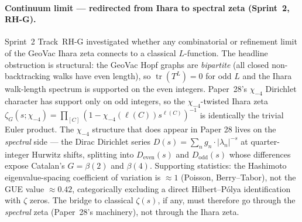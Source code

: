 \documentclass[11pt]{article}
\begin{document}
\paragraph{Continuum limit --- redirected from Ihara to spectral zeta
(Sprint~2, RH-G).}  Sprint~2 Track~RH-G investigated whether any
combinatorial or refinement limit of the GeoVac Ihara zeta connects
to a classical $L$-function.  The headline obstruction is structural:
the GeoVac Hopf graphs are \emph{bipartite} (all closed
non-backtracking walks have even length), so $\operatorname{tr}(T^L)=0$
for odd $L$ and the Ihara walk-length spectrum is supported on the
even integers.  Paper~28's $\chi_{-4}$ Dirichlet character has support
only on odd integers, so the $\chi_{-4}$-twisted Ihara zeta
$\zeta_G(s;\chi_{-4}) = \prod_{[C]}(1 - \chi_{-4}(\ell(C))s^{\ell(C)})^{-1}$
is identically the trivial Euler product.  The $\chi_{-4}$ structure
that does appear in Paper 28 lives on the \emph{spectral} side --- the
Dirac Dirichlet series $D(s) = \sum_{n} g_n\cdot |\lambda_n|^{-s}$ at
quarter-integer Hurwitz shifts, splitting into $D_{\text{even}}(s)$ and
$D_{\text{odd}}(s)$ whose differences expose Catalan's $G=\beta(2)$
and $\beta(4)$.  Supporting statistics: the Hashimoto eigenvalue-spacing
coefficient of variation is $\approx 1$ (Poisson, Berry--Tabor), not
the GUE value $\approx 0.42$, categorically excluding a direct
Hilbert--P\'olya identification with $\zeta$ zeros.  The bridge to
classical $\zeta(s)$, if any, must therefore go through the
\emph{spectral} zeta (Paper~28's machinery), not through the Ihara
zeta.
\end{document}

